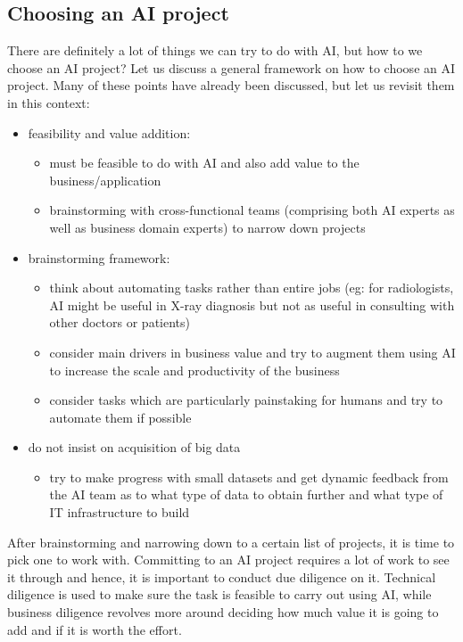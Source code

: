\documentclass{article}[a4paper,12pt]
\theoremstyle{definition}
\begin{document}
\subsection{Choosing an AI project}
There are definitely a lot of things we can try to do with AI, but how to we choose an AI project? Let us discuss a general framework on how to choose an AI project. Many of these points have already been discussed, but let us revisit them in this context:
\begin{itemize}
	\item feasibility and value addition:
	\begin{itemize}
		\item must be feasible to do with AI and also add value to the business/application
		\item brainstorming with cross-functional teams (comprising both AI experts as well as business domain experts) to narrow down projects
	\end{itemize}
	\item brainstorming framework:
	\begin{itemize}
		\item think about automating tasks rather than entire jobs (eg: for radiologists, AI might be useful in X-ray diagnosis but not as useful in consulting with other doctors or patients)
		\item consider main drivers in business value and try to augment them using AI to increase the scale and productivity of the business
		\item consider tasks which are particularly painstaking for humans and try to automate them if possible
	\end{itemize}
	\item do not insist on acquisition of big data
	\begin{itemize}
		\item try to make progress with small datasets and get dynamic feedback from the AI team as to what type of data to obtain further and what type of IT infrastructure to build
	\end{itemize}
\end{itemize}
After brainstorming and narrowing down to a certain list of projects, it is time to pick one to work with. Committing to an AI project requires a lot of work to see it through and hence, it is important to conduct due diligence on it. Technical diligence is used to make sure the task is feasible to carry out using AI, while business diligence revolves more around deciding how much value it is going to add and if it is worth the effort.
\end{document}
